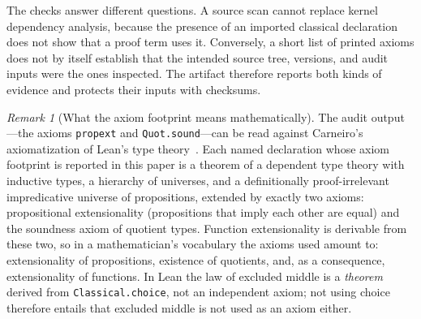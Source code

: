 \documentclass[11pt]{article}
\theoremstyle{definition}
\theoremstyle{remark}
\newtheorem{remark}[theorem]{Remark}
\begin{document}
The checks answer different questions.  A source scan cannot replace kernel dependency analysis, because the presence of an imported classical declaration does not show that a proof term uses it.  Conversely, a short list of printed axioms does not by itself establish that the intended source tree, versions, and audit inputs were the ones inspected.  The artifact therefore reports both kinds of evidence and protects their inputs with checksums.

\begin{remark}[What the axiom footprint means mathematically]
\label{rem:footprint}
The audit output---the axioms \texttt{propext} and \texttt{Quot.sound}---can be read against Carneiro's axiomatization of Lean's type theory~\cite{carneiro-2019}.  Each named declaration whose axiom footprint is reported in this paper is a theorem of a dependent type theory with inductive types, a hierarchy of universes, and a definitionally proof-irrelevant impredicative universe of propositions, extended by exactly two axioms: propositional extensionality (propositions that imply each other are equal) and the soundness axiom of quotient types.  Function extensionality is derivable from these two, so in a mathematician's vocabulary the axioms used amount to: extensionality of propositions, existence of quotients, and, as a consequence, extensionality of functions.  In Lean the law of excluded middle is a \emph{theorem} derived from \texttt{Classical.choice}, not an independent axiom; not using choice therefore entails that excluded middle is not used as an axiom either.


\end{remark}
\end{document}
